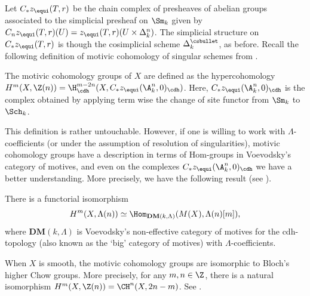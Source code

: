 Let $C_{\ast}z_{\equi}(T,r)$ be the chain complex of
presheaves of abelian groups associated to
the simplicial presheaf on $\Sm_k$ given by
$C_nz_{\equi}(T,r)(U) = z_{\equi}(T,r)(U \times \Delta^n_k)$.
The simplicial structure on $C_{\ast}z_{\equi}(T,r)$
is though the cosimplicial scheme $\Delta^{\csbullet}_k$, as before.
Recall the following definition of motivic cohomology of singular schemes
from \cite[Def.\,9.2]{FV}.

\begin{defn}\label{defn:MC-sing}
The motivic cohomology groups of $X$ are defined as the
hypercohomology
$H^m(X, \Z(n)) = \H^{m-2n}_{\cdh}(X, C_{\ast}z_{\equi}(\A^n_k,0)_{\cdh})$. Here, $C_{\ast}z_{\equi}(\A^n_k,0)_{\cdh}$ is the complex obtained by applying term wise the change of site functor from $\Sm_k$ to $\Sch_k$.
\end{defn}

This definition is rather untouchable. However, if one is willing to work with $\Lambda$\nobreakdash-coefficients (or under the assumption of resolution of singularities), motivic cohomology groups have a description in terms of Hom-groups in Voevodsky's category of motives, and even on the complexes $C_{\ast}z_{\equi}(\A^n_k,0)_{\cdh}$ we have a better understanding. More precisely, we have the following result (see \cite[Th.\,3.10]{KP}).
\begin{thm} There is a functorial
isomorphism \[H^m(X, \Lambda(n)) \simeq \Hom_{\mathbf{DM}(k, \Lambda)}(M(X), \Lambda(n)[m]),\] where
$\mathbf{DM}(k, \Lambda)$ is Voevodsky's non-effective category of motives for the cdh-topology (also known as the `big' category of motives) with $\Lambda$-coefficients.
\end{thm}

\begin{remk}
When $X$ is smooth, the motivic cohomology groups are isomorphic to Bloch's higher Chow groups. More precisely, for any $m,n\in \Z$, there is a natural isomorphism $H^m(X, \Z(n)) = \CH^n(X, 2n-m)$. See
\cite[Cor. 2]{VoevHigherChow}.
\end{remk}


